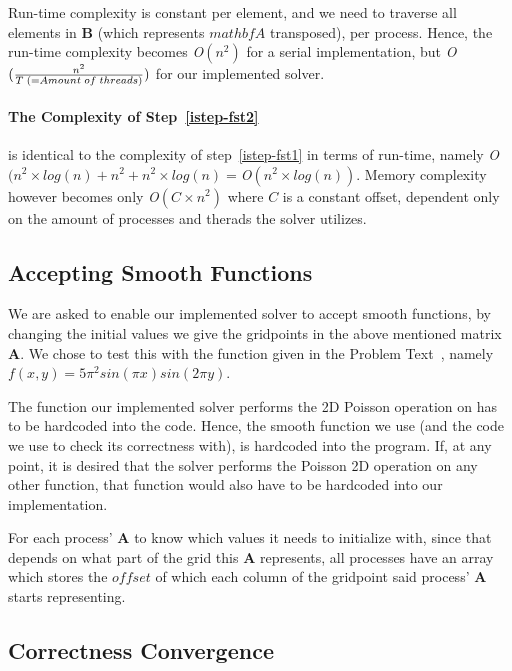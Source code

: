 \documentclass[fontsize=11pt,paper=a4,titlepage]{article}
\begin{document}
Run-time complexity is constant per element, and we need to traverse all
elements in $\mathbf{B}$ (which represents $mathbf{A}$ transposed), per process.
Hence, the run-time complexity becomes {\it O}$(n^2)$ for a serial
implementation, but {\it O}$(\frac{n^2}{T\thickspace (=Amount\thickspace of
\thickspace threads)})$ for our implemented solver.

\paragraph{The Complexity of Step~\ref{istep-fst2}} is identical to the
complexity of step~\ref{istep-fst1} in terms of run-time, namely {\it O}$(n^2
\times log(n) + n^2 + n^2\times log(n) = ${\it O}$(n^2\times
log(n))$. Memory complexity however becomes only {\it O}$(C\times n^2)$ where $
C$ is a constant offset, dependent only on the amount of processes and therads
the solver utilizes.

\subsection{Accepting Smooth Functions}

We are asked to enable our implemented solver to accept smooth functions, by
changing the initial values we give the gridpoints in the above mentioned matrix
$\mathbf{A}$. We chose to test this with the function given in the Problem
Text~\cite{InsertReferenceHere}, namely $f(x,y) = 5\pi^2 sin(\pi x) sin(2\pi
y)$.

The function our implemented solver performs the 2D Poisson operation on has to
be hardcoded into the code. Hence, the smooth function we use (and the code we
use to check its correctness with), is hardcoded into the program. If, at any
point, it is desired that the solver performs the Poisson 2D operation on any
other function, that function would also have to be hardcoded into our
implementation.

For each process' $\mathbf{A}$ to know which values it needs to initialize with,
since that depends on what part of the grid this $\mathbf{A}$ represents, all
processes have an array which stores the $offset$ of which each column of the
gridpoint said process' $\mathbf{A}$ starts representing.

\subsection{Correctness Convergence}
\end{document}
